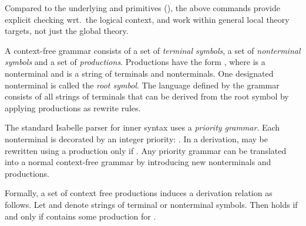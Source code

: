 \begin{isabellebody}
\begin{isamarkuptext}
  Compared to the underlying \hyperlink{command.syntax}{\mbox{}} and \hyperlink{command.no-syntax}{\mbox{}} primitives (), the above commands
  provide explicit checking wrt.\ the logical context, and work within
  general local theory targets, not just the global theory.%
\end{isamarkuptext}%
\isamarkuptrue%
%
\isamarkuptrue%
%
\isamarkuptrue%
%
\begin{isamarkuptext}%
A context-free grammar consists of a set of \emph{terminal
  symbols}, a set of \emph{nonterminal symbols} and a set of
  \emph{productions}.  Productions have the form ,
  where  is a nonterminal and \isa{{\isasymgamma}} is a string of
  terminals and nonterminals.  One designated nonterminal is called
  the \emph{root symbol}.  The language defined by the grammar
  consists of all strings of terminals that can be derived from the
  root symbol by applying productions as rewrite rules.

  The standard Isabelle parser for inner syntax uses a \emph{priority
  grammar}.  Each nonterminal is decorated by an integer priority:
  .  In a derivation,  may be rewritten
  using a production  only if .  Any
  priority grammar can be translated into a normal context-free
  grammar by introducing new nonterminals and productions.

  \medskip Formally, a set of context free productions 
  induces a derivation relation  as follows.  Let \isa{{\isasymalpha}} and \isa{{\isasymbeta}} denote strings of terminal or nonterminal symbols.
  Then  holds if and only if 
  contains some production  for .


\end{isamarkuptext}
\end{isabellebody}
